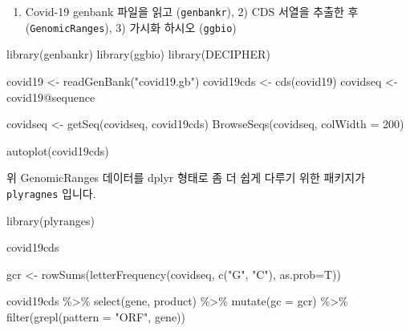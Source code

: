 \documentclass[
]{book}
\newenvironment{Shaded}{\begin{snugshade}}{\end{snugshade}}
\newcommand{\AttributeTok}[1]{\textcolor[rgb]{0.77,0.63,0.00}{#1}}
\newcommand{\DecValTok}[1]{\textcolor[rgb]{0.00,0.00,0.81}{#1}}
\newcommand{\FunctionTok}[1]{\textcolor[rgb]{0.00,0.00,0.00}{#1}}
\newcommand{\NormalTok}[1]{#1}
\newcommand{\OtherTok}[1]{\textcolor[rgb]{0.56,0.35,0.01}{#1}}
\newcommand{\SpecialCharTok}[1]{\textcolor[rgb]{0.00,0.00,0.00}{#1}}
\newcommand{\StringTok}[1]{\textcolor[rgb]{0.31,0.60,0.02}{#1}}
\providecommand{\tightlist}{%
  \setlength{\itemsep}{0pt}\setlength{\parskip}{0pt}}
\begin{document}
\begin{enumerate}
\def\labelenumi{\arabic{enumi})}
\tightlist
\item
  Covid-19 genbank 파일을 읽고 (\texttt{genbankr}), 2) CDS 서열을 추출한 후 (\texttt{GenomicRanges}), 3) 가시화 하시오 (\texttt{ggbio})
\end{enumerate}

\begin{Shaded}
\begin{Highlighting}[]
\FunctionTok{library}\NormalTok{(genbankr)}
\FunctionTok{library}\NormalTok{(ggbio)}
\FunctionTok{library}\NormalTok{(DECIPHER)}

\NormalTok{covid19 }\OtherTok{\textless{}{-}} \FunctionTok{readGenBank}\NormalTok{(}\StringTok{"covid19.gb"}\NormalTok{)}
\NormalTok{covid19cds }\OtherTok{\textless{}{-}} \FunctionTok{cds}\NormalTok{(covid19)}
\NormalTok{covidseq }\OtherTok{\textless{}{-}}\NormalTok{ covid19}\SpecialCharTok{@}\NormalTok{sequence}


\NormalTok{covidseq }\OtherTok{\textless{}{-}} \FunctionTok{getSeq}\NormalTok{(covidseq, covid19cds)}
\FunctionTok{BrowseSeqs}\NormalTok{(covidseq, }\AttributeTok{colWidth =} \DecValTok{200}\NormalTok{)}

\FunctionTok{autoplot}\NormalTok{(covid19cds)}
\end{Highlighting}
\end{Shaded}

위 GenomicRanges 데이터를 dplyr 형태로 좀 더 쉽게 다루기 위한 패키지가 \texttt{plyragnes} 입니다.

\begin{Shaded}
\begin{Highlighting}[]
\FunctionTok{library}\NormalTok{(plyranges)}

\NormalTok{covid19cds}

\NormalTok{gcr }\OtherTok{\textless{}{-}} \FunctionTok{rowSums}\NormalTok{(}\FunctionTok{letterFrequency}\NormalTok{(covidseq, }\FunctionTok{c}\NormalTok{(}\StringTok{"G"}\NormalTok{, }\StringTok{"C"}\NormalTok{), }\AttributeTok{as.prob=}\NormalTok{T))}

\NormalTok{covid19cds }\SpecialCharTok{\%\textgreater{}\%} 
  \FunctionTok{select}\NormalTok{(gene, product) }\SpecialCharTok{\%\textgreater{}\%} 
  \FunctionTok{mutate}\NormalTok{(}\AttributeTok{gc =}\NormalTok{ gcr) }\SpecialCharTok{\%\textgreater{}\%}
  \FunctionTok{filter}\NormalTok{(}\FunctionTok{grepl}\NormalTok{(}\AttributeTok{pattern =} \StringTok{"ORF"}\NormalTok{, gene)) }
\end{Highlighting}
\end{Shaded}
\end{document}
